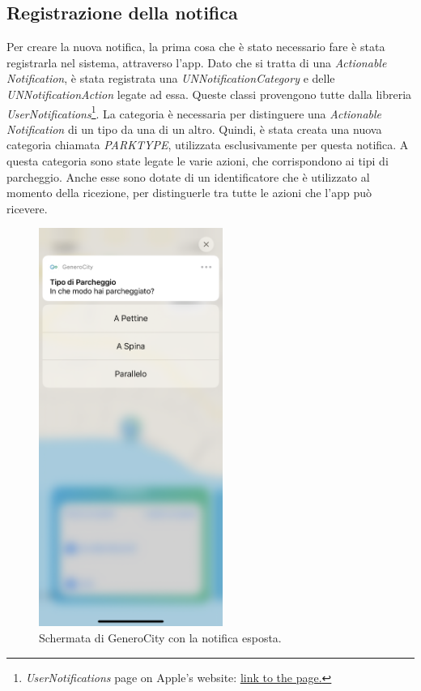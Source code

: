\subsection{Registrazione della notifica}

Per creare la nuova notifica, la prima cosa che è stato necessario fare è stata registrarla
nel sistema, attraverso l'app. Dato che si tratta di una \emph{Actionable Notification},
è stata registrata una \emph{UNNotificationCategory} e delle \emph{UNNotificationAction}
legate ad essa. Queste classi provengono tutte dalla libreria \emph{UserNotifications}\footnote{
\emph{UserNotifications} page on Apple's website: 
\href{https://developer.apple.com/documentation/usernotifications}{\underline{link to the page.}}}. 
La categoria è necessaria per distinguere una \emph{Actionable Notification}
di un tipo da una di un altro. Quindi, è stata creata una nuova categoria chiamata 
\emph{PARKTYPE}, utilizzata esclusivamente per questa notifica. A questa categoria sono 
state legate le varie azioni, che corrispondono ai tipi di parcheggio. Anche esse sono
dotate di un identificatore che è utilizzato al momento della ricezione, per distinguerle
tra tutte le azioni che l'app può ricevere.
\begin{figure}
    \caption{Schermata di GeneroCity con la notifica esposta.}
    \label{fig:presentazione_notifica}
    \includegraphics[width=6cm]{images/presentazione_notifica.png}
    \end{figure} 


